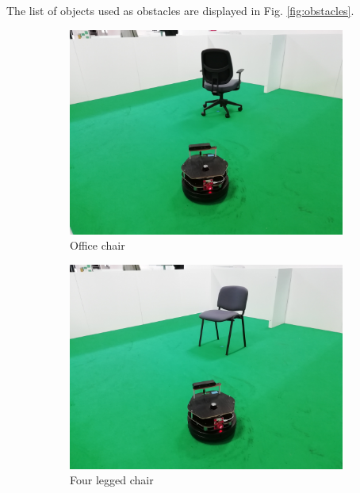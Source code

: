 The list of objects used as obstacles are displayed in Fig. \ref{fig:obstacles}.
\begin{figure}[h!]
  \centering
  \begin{subfigure}[b]{0.3\linewidth}
    \includegraphics[width=\linewidth]{imgs/chapter5/wchair.jpg}
     \caption{Office chair}
     \label{fig::wchair}
  \end{subfigure}
  \begin{subfigure}[b]{0.3\linewidth}
    \includegraphics[width=\linewidth]{imgs/chapter5/nchair.jpg}
    \caption{Four legged chair}
    \label{fig::nchair}
  \end{subfigure}
  \begin{subfigure}[b]{0.3\linewidth}

\end{subfigure}
\end{figure}
